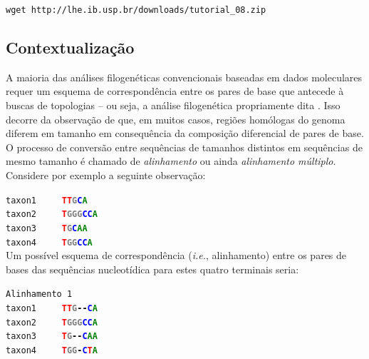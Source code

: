 \begin{center}
\small \texttt{wget http://lhe.ib.usp.br/downloads/tutorial\_08.zip}\\
\end{center}

\newpage
\pagestyle{fancy} %
\begin{refsection}
\renewcommand*{\finalnamedelim}{\addspace\&\space} %
%
\newcommand{\A}{\textcolor{green}{\textbf{A}}}
\newcommand{\C}{\textcolor{blue}{\textbf{C}}}
\newcommand{\G}{\textcolor{gray}{\textbf{G}}}
\newcommand{\T}{\textcolor{red}{\textbf{T}}}
\newcommand{\gap}{\textcolor{black}{\textbf{-}}}


\section{Contextualização}\label{tut8:context}

A maioria das análises filogenéticas convencionais baseadas em dados moleculares requer um esquema de correspondência entre os pares de base que antecede à buscas de topologias -- ou seja, a análise filogenética propriamente dita \parencite{Wheeler_2012}. Isso decorre da observação de que, em muitos casos, regiões homólogas do genoma diferem em tamanho em consequência da composição diferencial de pares de base. O processo de conversão entre sequências de tamanhos distintos em sequências de mesmo tamanho é chamado de \textit{alinhamento} ou ainda \textit{alinhamento múltiplo}. Considere por exemplo a seguinte observação:


\indent\indent\indent\indent\indent\indent\indent\texttt{taxon1~~~~~\T\T\G\C\A}\\
\indent\indent\indent\indent\indent\indent\indent\texttt{taxon2~~~~~\T\G\G\G\C\C\A}\\
\indent\indent\indent\indent\indent\indent\indent\texttt{taxon3~~~~~\T\G\C\A\A}\\
\indent\indent\indent\indent\indent\indent\indent\texttt{taxon4~~~~~\T\G\G\C\C\A}\\

Um possível esquema de correspondência (\textit{i.e.}, alinhamento) entre os pares de bases das sequências nucleotídica para estes quatro terminais seria:

\texttt{Alinhamento 1}\\
\indent\indent\indent\indent\indent\indent\indent\texttt{taxon1~~~~~\T\T\G\gap\gap\C\A}\\
\indent\indent\indent\indent\indent\indent\indent\texttt{taxon2~~~~~\T\G\G\G\C\C\A}\\
\indent\indent\indent\indent\indent\indent\indent\texttt{taxon3~~~~~\T\G\gap\gap\C\A\A}\\
\indent\indent\indent\indent\indent\indent\indent\texttt{taxon4~~~~~\T\G\G\gap\C\T\A}\\


\end{refsection}
